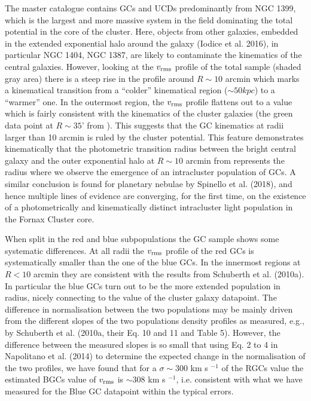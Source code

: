 \documentclass[useAMS,usenatbib]{mn2e}
\begin{document}
The master catalogue contains GCs and UCDs predominantly from NGC 1399, which is the largest and more massive system in the field dominating the total potential in the core of the cluster. Here, objects from other galaxies, embedded in the extended exponential halo around the galaxy (Iodice et al. 2016), in particular NGC 1404, NGC 1387, are likely to contaminate the kinematics of the central galaxies. However, looking at the $v_{\rm rms}$ profile of the total sample (shaded gray area) there is a steep rise in the profile around $R\sim10$ arcmin which marks a kinematical transition from a ``colder'' kinematical region ($\sim 50 kpc$) to a ``warmer'' one. In the outermost region, the $v_{\rm rms}$ profile flattens out to a value which is fairly consistent with the kinematics of the cluster galaxies (the green data point at $R\sim35’$ from \citealt{Drinkwater00}). This suggests that the GC kinematics at radii larger than 10 arcmin is ruled by the cluster potential. This feature demonstrates kinematically that the photometric transition radius between the bright central galaxy and the outer exponential halo at $R\sim10$ arcmin from \citet{Iodice16} represents the radius where we observe the emergence of an intracluster population of GCs. A similar conclusion is found for planetary nebulae by Spinello et al. (2018), and hence multiple lines of evidence are converging, for the first time, on the existence of a photometrically and kinematically distinct intracluster light population in the Fornax Cluster core.

When split in the red and blue subpopulations 
the GC sample shows some systematic differences. At all radii the $v_{\rm rms}$ profile of the red GCs is systematically smaller than the one of the blue GCs.  In the innermost regions at $R < 10$ arcmin they are consistent with the results from Schuberth et al. (2010a). In particular the blue GCs turn out to be the more extended population in radius, nicely connecting to the value of the cluster galaxy datapoint. The difference in normalisation between the two populations may be mainly driven from the different slopes of the two populations density profiles as measured, e.g., by Schuberth et al. (2010a, their Eq. 10 and 11 and Table 5). However, the difference between the measured slopes is so small that using Eq. 2 to 4 in Napolitano et al. (2014) to determine the expected change in the normalisation of the two profiles, we have found that for a $\sigma \sim 300$ km s $^{-1}$ of the RGCs value the estimated BGCs value of $v_{\rm rms}$ is $\sim 308$ km s $^{-1}$, i.e. consistent with what we have measured for the Blue GC datapoint within the typical errors.
\end{document}
